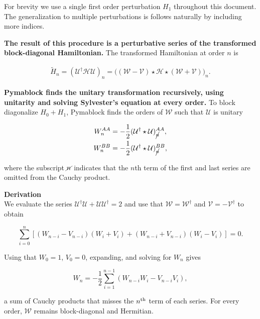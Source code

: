 For brevity we use a single first order perturbation $H_1$ throughout this
document. The generalization to multiple perturbations is follows naturally
by including more indices.

\textbf{The result of this procedure is a perturbative series of the transformed
block-diagonal Hamiltonian.}
The transformed Hamiltonian at order $n$ is

\begin{align}
\label{h_tilde}
\tilde{H}_{n} = (\mathcal{U}^{\dagger} \mathcal{H}
\mathcal{U})_{n} = \Big ( (\mathcal{W}-\mathcal{V}) \star \mathcal{H} \star
(\mathcal{W}+\mathcal{V}) \Big)_{n}.
\end{align}

\textbf{Pymablock finds the unitary transformation recursively, using unitarity and
solving Sylvester's equation at every order.}
To block diagonalize $H_0 + H_1$, Pymablock finds the
orders of $\mathcal{W}$ such that $\mathcal{U}$ is unitary

\begin{align}
\label{unitarity}
W_{n}^{AA} &= - \frac{1}{2} (\mathcal{U}^{\dagger} \star \mathcal{U})_{\cancel{n}}^{AA}, \\
W_{n}^{BB} &= - \frac{1}{2} (\mathcal{U}^{\dagger} \star \mathcal{U})_{\cancel{n}}^{BB},
\end{align}

where the subscript $\cancel{n}$ indicates that the $n$th term of the first
and last series are omitted from the Cauchy product.

\begin{framed}
\textbf{Derivation}\\
We evaluate the series $\mathcal{U}^\dagger \mathcal{U} +
\mathcal{U}\mathcal{U}^\dagger=2$ and use that
$\mathcal{W}=\mathcal{W}^\dagger$ and $\mathcal{V}= -\mathcal{V}^{\dagger}$
to obtain

\begin{equation}
\sum_{i=0}^n \left[(W_{n-i} - V_{n-i})(W_i +
V_i) + (W_{n-i} + V_{n-i})(W_i -
V_i)\right] = 0.
\end{equation}

Using that $W_0=1$, $V_0=0$, expanding, and solving for
$W_n$ gives

\begin{equation}
W_{n} = - \frac{1}{2}
\sum_{i=1}^{n-1}(W_{n-i}W_i -
V_{n-i}V_i),
\end{equation}

a sum of Cauchy products that misses the $n \textsuperscript{th}$ term of each
series.
For every order, $\mathcal{W}$ remains block-diagonal and Hermitian.
\end{framed}

